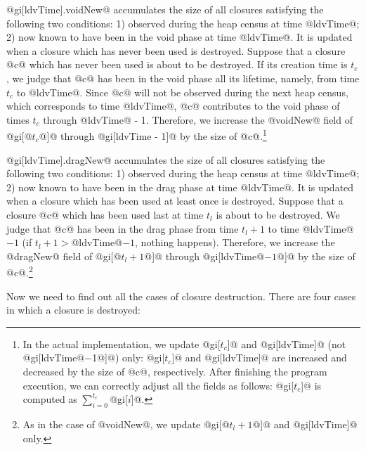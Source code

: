 \documentclass{article}
\begin{document}
@gi[ldvTime].voidNew@ accumulates the size of all closures satisfying
the following two conditions: 1) observed during the heap census at
time @ldvTime@; 2) now known to have been in the void phase at time
@ldvTime@.  It is updated when a closure which has never been used is
destroyed.  Suppose that a closure @c@ which has never been used is
about to be destroyed.  If its creation time is $t_c$, we judge that
@c@ has been in the void phase all its lifetime, namely, from time
$t_c$ to @ldvTime@.  Since @c@ will not be observed during the next
heap census, which corresponds to time @ldvTime@, @c@ contributes to
the void phase of times $t_c$ through @ldvTime@ - 1.  Therefore, we
increase the @voidNew@ field of @gi[@$t_c$@]@ through @gi[ldvTime - 1]@
 by the size of @c@.\footnote{In the actual implementation, we
update @gi[$t_c$]@ and @gi[ldvTime]@ (not @gi[ldvTime@$ - $1@]@) only:
@gi[$t_c$]@ and @gi[ldvTime]@ are increased and decreased by the size
of @c@, respectively.  After finishing the program execution, we can
correctly adjust all the fields as follows: @gi[$t_c$]@ is computed as
$\sum_{i=0}^{t_c}$@gi[$i$]@.  }

@gi[ldvTime].dragNew@ accumulates the size of all closures satisfying the following
two conditions: 1) observed during the heap census at time @ldvTime@;
2) now known to have been in the drag phase at time @ldvTime@.
It is updated when a closure which has been used at least once is destroyed.
Suppose that a closure @c@ which has been used last at time $t_l$ is about to
be destroyed.
We judge that @c@ has been in the drag phase from time $t_l + 1$ to 
time @ldvTime@$ - 1$ (if $t_l + 1 > $@ldvTime@$ - 1$, nothing happens).
Therefore, we increase the @dragNew@ field of @gi[@$t_l + 1$@]@ through 
@gi[ldvTime@$ - 1$@]@
by the size of @c@.\footnote{As in the case of @voidNew@, we update
@gi[@$t_l + 1$@]@ and @gi[ldvTime]@ only.}

Now we need to find out all the cases of closure destruction.
There are four cases in which a closure is destroyed:
\end{document}
